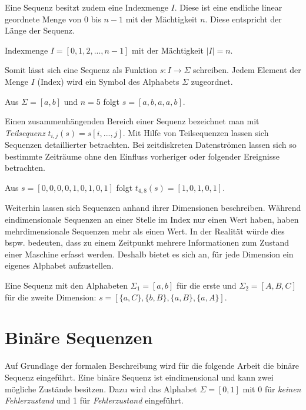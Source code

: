 Eine Sequenz besitzt zudem eine Indexmenge $I$. Diese ist eine endliche linear geordnete Menge von 0 bis $n-1$ mit der Mächtigkeit $n$. Diese entspricht der Länge der Sequenz.

\begin{theorem}
Indexmenge $I = [0,1,2,...,n-1]$ mit der Mächtigkeit $|I| = n$.
\end{theorem}

Somit lässt sich eine Sequenz als Funktion $s : I \rightarrow \Sigma$ schreiben. Jedem Element der Menge $I$ (Index) wird ein Symbol des Alphabets $\Sigma$ zugeordnet.

\begin{theorem}
Aus $\Sigma = [a,b]$ und $n = 5$ folgt $s = [a,b,a,a,b]$.
\end{theorem}

Einen zusammenhängenden Bereich einer Sequenz bezeichnet man mit \textit{Teilsequenz} $t_{i,j}(s) = s[i,...,j]$. Mit Hilfe von Teilsequenzen lassen sich Sequenzen detaillierter betrachten. Bei zeitdiskreten Datenströmen lassen sich so bestimmte Zeiträume ohne den Einfluss vorheriger oder folgender Ereignisse betrachten. 

\begin{theorem}
Aus $s = [0,0,0,0,1,0,1,0,1]$ folgt $t_{4,8}(s) = [1,0,1,0,1] $.
\end{theorem}

Weiterhin lassen sich Sequenzen anhand ihrer Dimensionen beschreiben. Während eindimensionale Sequenzen an einer Stelle im Index nur einen Wert haben, haben mehrdimensionale Sequenzen mehr als einen Wert. In der Realität würde dies bspw. bedeuten, dass zu einem Zeitpunkt mehrere Informationen zum Zustand einer Maschine erfasst werden. Deshalb bietet es sich an, für jede Dimension ein eigenes Alphabet aufzustellen.

\begin{theorem}
Eine Sequenz mit den Alphabeten $\Sigma_{1} = [a,b]$ für die erste und $\Sigma_{2} = [A,B,C]$ für die zweite Dimension: $s = [\{a,C\},\{b,B\},\{a,B\},\{a,A\}]$.
\end{theorem}

\section{Binäre Sequenzen}
\label{chp:binary-sequences}
Auf Grundlage der formalen Beschreibung wird für die folgende Arbeit die binäre Sequenz eingeführt. Eine binäre Sequenz ist eindimensional und kann zwei mögliche Zustände besitzen. Dazu wird das Alphabet $\Sigma = [0,1]$ mit 0 für \textit{keinen Fehlerzustand} und 1 für \textit{Fehlerzustand} eingeführt.

